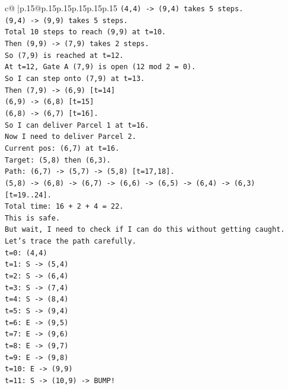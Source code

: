 \documentclass{article}
\begin{document}
{\begin{supertabular}{c@{$\;$}|p{.15\linewidth}@{}p{.15\linewidth}p{.15\linewidth}p{.15\linewidth}p{.15\linewidth}p{.15\linewidth}}
{{{\texttt{(4,4) {-}> (9,4) takes 5 steps.} \\
\texttt{(9,4) {-}> (9,9) takes 5 steps.} \\
\texttt{Total 10 steps to reach (9,9) at t=10.} \\
\texttt{Then (9,9) {-}> (7,9) takes 2 steps.} \\
\texttt{So (7,9) is reached at t=12.} \\
\texttt{At t=12, Gate A (7,9) is open (12 mod 2 = 0).} \\
\texttt{So I can step onto (7,9) at t=13.} \\
\texttt{Then (7,9) {-}> (6,9) {[}t=14{]}} \\
\texttt{(6,9) {-}> (6,8) {[}t=15{]}} \\
\texttt{(6,8) {-}> (6,7) {[}t=16{]}.} \\
\texttt{So I can deliver Parcel 1 at t=16.} \\
\texttt{Now I need to deliver Parcel 2.} \\
\texttt{Current pos: (6,7) at t=16.} \\
\texttt{Target: (5,8) then (6,3).} \\
\texttt{Path: (6,7) {-}> (5,7) {-}> (5,8) {[}t=17,18{]}.} \\
\texttt{(5,8) {-}> (6,8) {-}> (6,7) {-}> (6,6) {-}> (6,5) {-}> (6,4) {-}> (6,3) {[}t=19..24{]}.} \\
\texttt{Total time: 16 + 2 + 4 = 22.} \\
\texttt{This is safe.} \\
\texttt{But wait, I need to check if I can do this without getting caught.} \\
\texttt{Let's trace the path carefully.} \\
\texttt{t=0: (4,4)} \\
\texttt{t=1: S {-}> (5,4)} \\
\texttt{t=2: S {-}> (6,4)} \\
\texttt{t=3: S {-}> (7,4)} \\
\texttt{t=4: S {-}> (8,4)} \\
\texttt{t=5: S {-}> (9,4)} \\
\texttt{t=6: E {-}> (9,5)} \\
\texttt{t=7: E {-}> (9,6)} \\
\texttt{t=8: E {-}> (9,7)} \\
\texttt{t=9: E {-}> (9,8)} \\
\texttt{t=10: E {-}> (9,9)} \\
\texttt{t=11: S {-}> (10,9) {-}> BUMP!} \\
}}}
\end{supertabular}}
\end{document}
